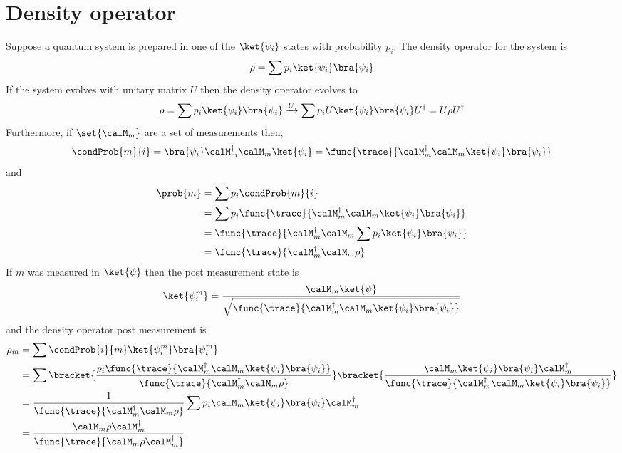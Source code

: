 \section{Density operator}
Suppose a quantum system is prepared in one of the \(\ket{\psi_i}\) states with probability \(p_i\). The density operator for the system is 
\begin{equation*}
    \rho = \sum p_i \ket{\psi_i} \bra{\psi_i}
\end{equation*}
If the system evolves with unitary matrix \(U\) then the density operator evolves to 
\begin{equation*}
    \rho = \sum p_i \ket{\psi_i} \bra{\psi_i} \xrightarrow{U} \sum p_i U\ket{\psi_i} \bra{\psi_i} U^{\dagger} = U \rho U^{\dagger}
\end{equation*}
Furthermore, if \(\set{\calM_m}\) are a set of measurements then,
\begin{equation*}
    \condProb{m}{i} = \bra{\psi_i} \calM_m^{\dagger} \calM_m \ket{\psi_i} = \func{\trace}{ \calM_m^{\dagger} \calM_m \ket{\psi_i} \bra{\psi_i}}
\end{equation*}
and 
\begin{align*}
    \prob{m} &= \sum p_i \condProb{m}{i}\\
    &= \sum p_i \func{\trace}{ \calM_m^{\dagger} \calM_m \ket{\psi_i} \bra{\psi_i}} \\
    &= \func{\trace}{ \calM_m^{\dagger} \calM_m \sum p_i \ket{\psi_i} \bra{\psi_i}} \\
    &= \func{\trace}{ \calM_m^{\dagger} \calM_m \rho}
\end{align*}
If \(m\) was measured in \(\ket{\psi}\) then the post measurement state is 
\begin{equation*}
    \ket{\psi_i^m} = \dfrac{\calM_m \ket{\psi}}{\sqrt{ \func{\trace}{ \calM_m^{\dagger} \calM_m \ket{\psi_i} \bra{\psi_i}}}}
\end{equation*}
and the density operator post measurement is 
\begin{align*}
    \rho_m &= \sum \condProb{i}{m} \ket{\psi_i^m} \bra{\psi_i^m}\\
    &= \sum \bracket{\dfrac{p_i \func{\trace}{ \calM_m^{\dagger} \calM_m \ket{\psi_i} \bra{\psi_i}}}{\func{\trace}{ \calM_m^{\dagger} \calM_m \rho}}} \bracket{\dfrac{\calM_m \ket{\psi_i} \bra{\psi_i} \calM_m^{\dagger}}{\func{\trace}{ \calM_m^{\dagger} \calM_m \ket{\psi_i} \bra{\psi_i}}}}\\
    &= \dfrac{1}{\func{\trace}{ \calM_m^{\dagger} \calM_m \rho}} \sum  p_i \calM_m \ket{\psi_i} \bra{\psi_i} \calM_m^{\dagger}\\
    &= \dfrac{\calM_m \rho \calM_m^{\dagger}}{\func{\trace}{  \calM_m \rho \calM_m^{\dagger}}}
\end{align*}

